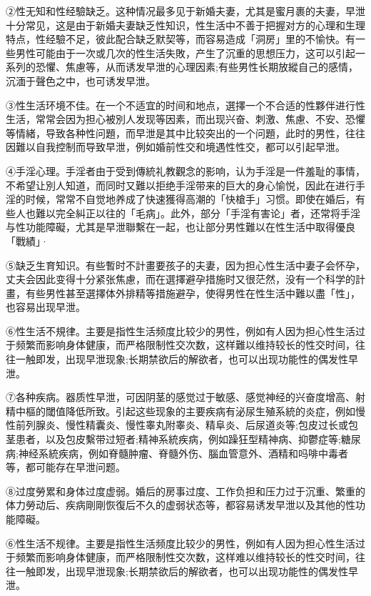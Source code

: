 \documentclass[12pt,UTF8]{ctexbook}
\begin{document}
②性无知和性经驗缺乏。这种情况最多见于新婚夫妻，尤其是蜜月裹的夫妻，早泄十分常见，这是由于新婚夫妻缺乏性知识，性生活中不善于把握对方的心理和生理特点，性经驗不足，彼此配合缺乏默契等，而容易造成「洞房」里的不愉快。有一些男性可能由于一次或几次的性生活失敗，产生了沉重的思想压力，这可以引起一系列的恐懼、焦慮等，从而诱发早泄的心理因素;有些男性长期放縱自己的感情，沉湎于聲色之中，也可诱发早泄。

③性生活环境不佳。在一个不适宜的时间和地点，選擇一个不合适的性夥伴进行性生活，常常会因为担心被別人发现等因素，而出现兴奋、刺激、焦慮、不安、恐懼等情緒，导致各种性问題，而早泄是其中比较突出的一个问題，此时的男性，往往因難以自我控制而导致早泄，例如婚前性交和境遇性性交，都可以引起早泄。

④手淫心理。手淫者由于受到傳統礼教觀念的影响，认为手淫是一件羞耻的事情，不希望让別人知道，而同时又難以拒绝手淫带来的巨大的身心愉悦，因此在进行手淫的时候，常常不自觉地养成了快速獲得高潮的「快槍手」习惯。即使在婚后，有些人也難以完全糾正以往的「毛病」。此外，部分「手淫有害论」者，还常将手淫与性功能障礙，尤其是早泄聯繫在一起，也让部分男性難以在性生活中取得優良「戰績」·

⑤缺乏生育知识。有些暫时不計畫要孩子的夫妻，因为担心性生活中妻子会怀孕，丈夫会因此变得十分紧张焦慮，而在選擇避孕措施时又很茫然，没有一个科学的計畫，有些男性甚至選擇体外排精等措施避孕，使得男性在性生活中難以盡「性」，也容易出现早泄。

⑥性生活不規律。主要是指性生活频度比较少的男性，例如有人因为担心性生活过于频繁而影响身体健康，而严格限制性交次数，这样難以维持较长的性交时间，往往一触即发，出现早泄现象;长期禁欲后的解欲者，也可以出现功能性的偶发性早泄。

⑦各种疾病。器质性早泄，可因阴茎的感觉过于敏感、感觉神经的兴奋度增高、射精中樞的閾值降低所致。引起这些现象的主要疾病有泌尿生殖系統的炎症，例如慢性前列腺炎、慢性精囊炎、慢性睾丸附睾炎、精阜炎、后尿道炎等;包皮过长或包茎患者，以及包皮繫带过短者;精神系統疾病，例如躁狂型精神病、抑鬱症等;糖尿病;神经系統疾病，例如脊髓肿瘤、脊髓外伤、腦血管意外、酒精和吗啡中毒者等，都可能存在早泄问题。

⑧过度勞累和身体过度虚弱。婚后的房事过度、工作负担和压力过于沉重、繁重的体力勞动后、疾病剛剛恢復后不久的虚弱状态等，都容易诱发早泄以及其他的性功能障礙。

⑥性生活不规律。主要是指性生活频度比较少的男性，例如有人因为担心性生活过于频繁而影响身体健康，而严格限制性交次数，这样难以维持较长的性交时间，往往一触即发，出现早泄现象;长期禁欲后的解欲者，也可以出现功能性的偶发性早泄。
\end{document}

